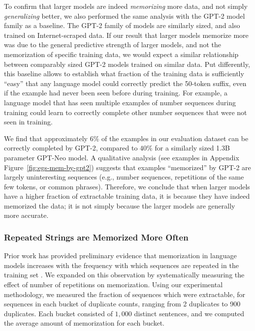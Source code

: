 To confirm that larger models are indeed \emph{memorizing} more data, and not simply \emph{generalizing} better, we also performed the same analysis with the GPT-2 model family as a baseline. 
%
The GPT-2 family of models are similarly sized, and also trained on Internet-scraped data.
If our result that larger models memorize more was due to the general predictive strength of larger models, and not the memorization of specific training data, we would expect a similar relationship between comparably sized GPT-2 models trained on similar data. 
%
Put differently, this baseline allows to establish
what fraction of the training data is sufficiently ``easy'' that any language model could correctly
predict the 50-token suffix, even if the example had never been seen before during training.
For example, a language model that has seen multiple examples of number sequences during training could learn to correctly complete other number sequences that were not seen in training.
%
%

We find that approximately $6\%$ of the examples in our evaluation dataset can be correctly 
completed by GPT-2, compared to $40\%$ for a similarly sized 1.3B parameter GPT-Neo model. 
A qualitative analysis (see examples in Appendix Figure~\ref{fig:egs-mem-by-gpt2}) suggests that examples ``memorized'' by GPT-2 are largely uninteresting
sequences (e.g., number sequences, repetitions of the same few tokens, or common phrases).
%
Therefore, we conclude that when larger models have a higher fraction of extractable training data,
it is because they have indeed memorized the data; it is not simply because the larger models are generally more accurate.


\subsubsection{Repeated Strings are Memorized More Often}
\label{sec:duplicates}
Prior work has provided preliminary evidence that memorization in language models increases with the frequency with which sequences are repeated in the training set \citep{carlini2020extracting, lee2021deduplicating}.
%
We expanded on this observation by systematically measuring the effect of number of repetitions on memorization.
%
Using our experimental methodology, we measured the fraction of sequences which were extractable, for sequences in each bucket of duplicate counts, ranging from 2 duplicates to 900 duplicates.
Each bucket consisted of $1{,}000$ distinct sentences, and we computed the average amount of memorization for each bucket.


